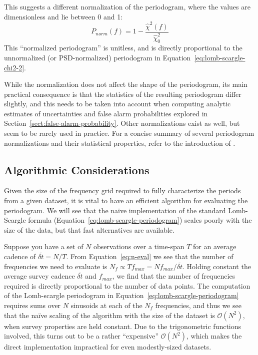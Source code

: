 \documentclass[preprint]{aastex}
\newcommand{\Eq}[1]{Equation~\ref{eq:#1}}
\newcommand{\eq}[1]{\Eq{#1}}
\newcommand{\eqlabel}[1]{\label{eq:#1}}
\newcommand{\Sect}[1]{Section~\ref{sect:#1}}
\newcommand{\sect}[1]{\Sect{#1}}
\newcommand{\sectlabel}[1]{\label{sect:#1}}
\begin{document}
This suggests a different normalization of the periodogram, where the values
are dimensionless and lie between 0 and 1:
\begin{equation}
  P_{norm}(f) = 1 - \frac{\hat{\chi}^2(f)}{\hat{\chi}^2_0}
  \eqlabel{lomb-scargle-normalized}
\end{equation}
This ``normalized periodogram'' is unitless, and
is directly proportional to the unnormalized
(or PSD-normalized) periodogram in \eq{lomb-scargle-chi2-2}.

While the normalization does not affect the shape of the periodogram,
its main practical consequence is that the statistics of the resulting
periodogram differ slightly, and this needs to be taken into account when
computing analytic estimates of uncertainties and false alarm probabilities
explored in \sect{false-alarm-probability}.
Other normalizations exist as well, but seem to be rarely used in practice.
For a concise summary of several periodogram normalizations and their
statistical properties, refer to the introduction of \citet{Baluev2008}.

\subsection{Algorithmic Considerations}
\sectlabel{algorithmic-considerations}
Given the size of the frequency grid required to fully characterize the periods
from a given dataset, it is vital to have an efficient algorithm for evaluating
the periodogram. We will see that the na{\"i}ve implementation of
the standard Lomb-Scargle formula (\eq{lomb-scargle-periodogram})
scales poorly with the size of the data, but that
fast alternatives are available.

Suppose you have a set of $N$ observations over a time-span $T$ for an average
cadence of $\overline{\delta t} = N/T$.
From \eq{n-eval} we see that the number of frequencies we need to evaluate is
$N_f \propto T f_{max} = N f_{max} / \overline{\delta t}$.
Holding constant the average survey cadence $\overline{\delta t}$ and
$f_{max}$, we find that the number of
frequencies required is directly proportional to the number of data points.
The computation of the Lomb-scargle periodogram in \eq{lomb-scargle-periodogram}
requires sums over $N$ sinusoids at each of the
$N_f$ frequencies, and thus we see that the
na{\"i}ve scaling of the algorithm with the size of the dataset is
$\mathcal{O}(N^2)$, when survey properties are held constant.
Due to the trigonometric functions involved, this turns out to be a rather
``expensive'' $\mathcal{O}(N^2)$, which makes the direct
implementation impractical for even modestly-sized datasets.
\end{document}
